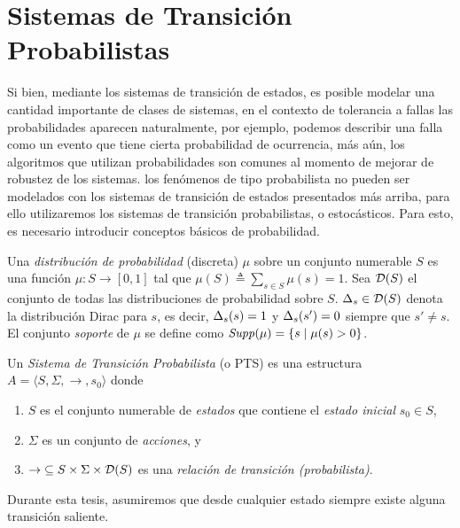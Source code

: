 \section{Sistemas de Transición Probabilistas} 

Si bien, mediante los sistemas de transición de estados, es posible modelar una cantidad importante de clases de sistemas, en el contexto de tolerancia a fallas las probabilidades aparecen naturalmente, por ejemplo, podemos describir una falla como un evento que tiene cierta probabilidad de ocurrencia, más aún, los algoritmos que utilizan probabilidades son  comunes al momento de mejorar de robustez de los sistemas. los fenómenos de tipo probabilista no pueden ser modelados con los sistemas de transición de estados presentados más arriba, para ello utilizaremos  los sistemas de transición probabilistas, o estocásticos. Para esto, es necesario introducir conceptos básicos de probabilidad.

Una \emph{distribución de probabilidad} (discreta) $\mu$ sobre un conjunto numerable $S$ es una función $\mu: S \rightarrow [0, 1] $  tal que $\mu(S) \triangleq \sum_{s \in S} \mu(s) = 1$. 
Sea $\mathcal{D}(S)$ el conjunto de todas las distribuciones de probabilidad sobre $S$. $\Delta_s \in \mathcal{D}(S)$ denota la distribución Dirac para $s$, es decir, $\Delta_s(s) =1$ y $\Delta_s(s') = 0$ siempre que $s'\neq s$.
El conjunto \textit{soporte} de $\mu$ se define como $\mathit{Supp}(\mu) = \{s \mid \mu (s) > 0\}$.

Un \emph{Sistema de Transición Probabilista} (o PTS) es una estructura $A = \langle S, \Sigma, \rightarrow, s_0 \rangle$ 
donde 
\begin{enumerate}
\item%
  $S$ es el conjunto numerable de \emph{estados} que contiene el
  \emph{estado inicial} $s_0 \in S$,
\item%
  $\Sigma$ es un conjunto de \emph{acciones}, y
\item%
  ${\rightarrow} \subseteq S \times \Sigma \times \mathcal{D}(S)$ es una
  \emph{relación de transición (probabilista)}.
\end{enumerate}
Durante esta tesis, asumiremos que desde cualquier estado siempre existe alguna transición saliente.

